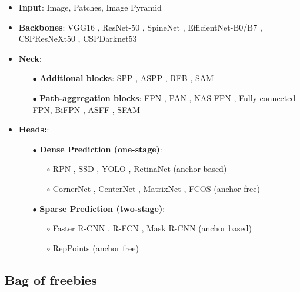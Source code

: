 \documentclass[10pt,twocolumn,letterpaper]{article}
\begin{document}
\begin{itemize}
	\item \textbf{Input}: Image, Patches, Image Pyramid
	\item \textbf{Backbones}: VGG16 \cite{simonyan2014very}, ResNet-50 \cite{he2016deep}, SpineNet \cite{du2019spinenet}, EfficientNet-B0/B7 \cite{tan2019efficientnet}, CSPResNeXt50 \cite{wang2020cspnet}, CSPDarknet53 \cite{wang2020cspnet}
	\item \textbf{Neck}:
	\begin{itemize}
		\item[$\bullet$] \textbf{Additional blocks}:  SPP \cite{he2015spatial}, ASPP \cite{chen2017deeplab}, RFB \cite{liu2018receptive}, SAM \cite{woo2018cbam}
		\item[$\bullet$] \textbf{Path-aggregation blocks}: FPN \cite{lin2017feature}, PAN \cite{liu2018path}, NAS-FPN \cite{ghiasi2019fpn}, Fully-connected FPN, BiFPN \cite{tan2019efficientdet}, ASFF \cite{liu2019learning}, SFAM \cite{zhao2019m2det}
	\end{itemize}
	\item \textbf{Heads:}:
	\begin{itemize}
		\item[$\bullet$] \textbf{Dense Prediction (one-stage)}:    	
		\begin{itemize}
			\item[$\circ$] RPN \cite{ren2015faster}, SSD \cite{liu2016ssd}, YOLO \cite{redmon2016you}, RetinaNet \cite{lin2017focal} (anchor based)
			\item[$\circ$] CornerNet \cite{law2018cornernet}, CenterNet \cite{duan2019centernet}, MatrixNet \cite{rashwan2019matrix}, FCOS \cite{tian2019fcos} (anchor free)
		\end{itemize}
		\item[$\bullet$] \textbf{Sparse Prediction (two-stage)}: 
		\begin{itemize}
			\item[$\circ$] Faster R-CNN \cite{ren2015faster}, R-FCN \cite{dai2016r}, Mask R-CNN \cite{he2017mask} (anchor based)
			\item[$\circ$] RepPoints \cite{yang2019reppoints} (anchor free)
		\end{itemize}
	\end{itemize}
\end{itemize}

\subsection{Bag of freebies}
\end{document}
